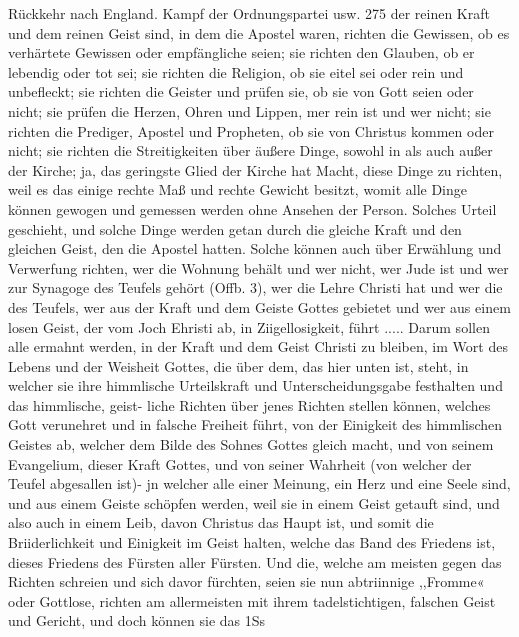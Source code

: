 Rückkehr nach England. Kampf der Ordnungspartei usw. 275
der reinen Kraft und dem reinen Geist sind, in dem die Apostel
waren, richten die Gewissen, ob es verhärtete Gewissen oder
empfängliche seien; sie richten den Glauben, ob er lebendig oder
tot sei; sie richten die Religion, ob sie eitel sei oder rein und
unbefleckt; sie richten die Geister und prüfen sie, ob sie von Gott
seien oder nicht; sie prüfen die Herzen, Ohren und Lippen,
mer rein ist und wer nicht; sie richten die Prediger, Apostel
und Propheten, ob sie von Christus kommen oder nicht; sie
richten die Streitigkeiten über äußere Dinge, sowohl in als
auch außer der Kirche; ja, das geringste Glied der Kirche hat
Macht, diese Dinge zu richten, weil es das einige rechte Maß
und rechte Gewicht besitzt, womit alle Dinge können gewogen
und gemessen werden ohne Ansehen der Person. Solches
Urteil geschieht, und solche Dinge werden getan durch die gleiche
Kraft und den gleichen Geist, den die Apostel hatten. Solche
können auch über Erwählung und Verwerfung richten, wer die
Wohnung behält und wer nicht, wer Jude ist und wer zur
Synagoge des Teufels gehört (Offb. 3), wer die Lehre Christi hat
und wer die des Teufels, wer aus der Kraft und dem Geiste Gottes
gebietet und wer aus einem losen Geist, der vom Joch Ehristi
ab, in Ziigellosigkeit, führt ..... Darum sollen alle ermahnt
werden, in der Kraft und dem Geist Christi zu bleiben, im Wort
des Lebens und der Weisheit Gottes, die über dem, das hier
unten ist, steht, in welcher sie ihre himmlische Urteilskraft
und Unterscheidungsgabe festhalten und das himmlische, geist-
liche Richten über jenes Richten stellen können, welches Gott
verunehret und in falsche Freiheit führt, von der Einigkeit des
himmlischen Geistes ab, welcher dem Bilde des Sohnes Gottes
gleich macht, und von seinem Evangelium, dieser Kraft Gottes,
und von seiner Wahrheit (von welcher der Teufel abgesallen ist)-
jn welcher alle einer Meinung, ein Herz und eine Seele sind, und
aus einem Geiste schöpfen werden, weil sie in einem Geist
getauft sind, und also auch in einem Leib, davon Christus das
Haupt ist, und somit die Briiderlichkeit und Einigkeit im Geist
halten, welche das Band des Friedens ist, dieses Friedens des
Fürsten aller Fürsten. Und die, welche am meisten gegen das
Richten schreien und sich davor fürchten, seien sie nun abtriinnige
,,Fromme« oder Gottlose, richten am allermeisten mit ihrem
tadelstichtigen, falschen Geist und Gericht, und doch können sie das
1Ss


